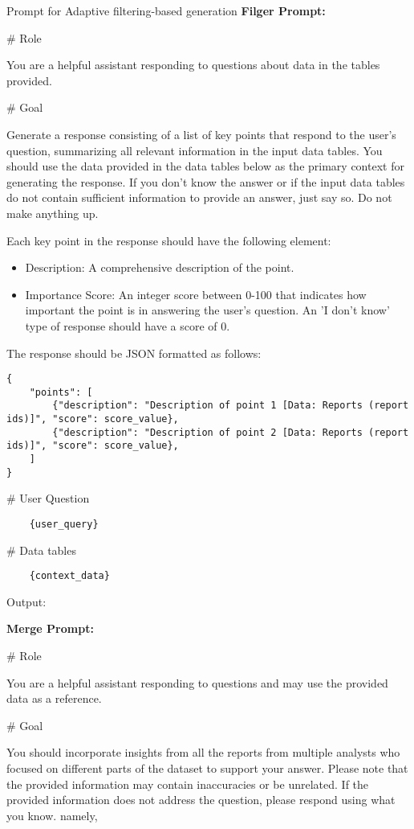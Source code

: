 \begin{figure*}[t] 
\begin{AIbox}{Prompt for Adaptive filtering-based generation}
{\bf Filger Prompt:} \\
{%
\# Role

You are a helpful assistant responding to questions about data in the tables provided.

\# Goal

Generate a response consisting of a list of key points that respond to the user's question, summarizing all relevant information in the input data tables.
You should use the data provided in the data tables below as the primary context for generating the response.
If you don't know the answer or if the input data tables do not contain sufficient information to provide an answer, just say so. Do not make anything up.

Each key point in the response should have the following element:
\begin{itemize}
    \item Description: A comprehensive description of the point.
    \item Importance Score: An integer score between 0-100 that indicates how important the point is in answering the user's question. An 'I don't know' type of response should have a score of 0.
\end{itemize}

The response should be JSON formatted as follows:

\begin{verbatim}
{
    "points": [
        {"description": "Description of point 1 [Data: Reports (report ids)]", "score": score_value},
        {"description": "Description of point 2 [Data: Reports (report ids)]", "score": score_value},
    ]
}
\end{verbatim}
\# User Question
\begin{verbatim}
    {user_query}
\end{verbatim}

\# Data tables
\begin{verbatim}
    {context_data}
\end{verbatim}
Output:
}
\tcbline
{\bf Merge Prompt:} \\
{%
\# Role

You are a helpful assistant responding to questions and may use the provided data as a reference.

\# Goal

You should incorporate insights from all the reports from multiple analysts who focused on different parts of the dataset to support your answer. Please note that the provided information may contain inaccuracies or be unrelated. If the provided information does not address the question, please respond using what you know. namely,

}
\end{AIbox}
\end{figure*}
